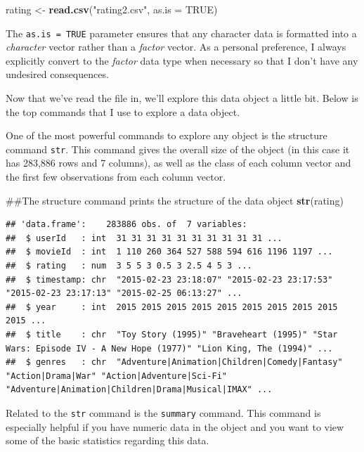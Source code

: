 \documentclass[]{book}
\newenvironment{Shaded}{\begin{snugshade}}{\end{snugshade}}
\newcommand{\KeywordTok}[1]{\textcolor[rgb]{0.13,0.29,0.53}{\textbf{{#1}}}}
\newcommand{\DataTypeTok}[1]{\textcolor[rgb]{0.13,0.29,0.53}{{#1}}}
\newcommand{\StringTok}[1]{\textcolor[rgb]{0.31,0.60,0.02}{{#1}}}
\newcommand{\OtherTok}[1]{\textcolor[rgb]{0.56,0.35,0.01}{{#1}}}
\newcommand{\NormalTok}[1]{{#1}}
\begin{document}
\begin{Shaded}
\begin{Highlighting}[]
\NormalTok{rating <-}\StringTok{ }\KeywordTok{read.csv}\NormalTok{(}\StringTok{"rating2.csv"}\NormalTok{, }\DataTypeTok{as.is =} \OtherTok{TRUE}\NormalTok{)}
\end{Highlighting}
\end{Shaded}

The \texttt{as.is\ =\ TRUE} parameter ensures that any character data is
formatted into a \emph{character} vector rather than a \emph{factor}
vector. As a personal preference, I always explicitly convert to the
\emph{factor} data type when necessary so that I don't have any
undesired consequences.

Now that we've read the file in, we'll explore this data object a little
bit. Below is the top commands that I use to explore a data object.

One of the most powerful commands to explore any object is the structure
command \texttt{str}. This command gives the overall size of the object
(in this case it has 283,886 rows and 7 columns), as well as the class
of each column vector and the first few observations from each column
vector.

\begin{Shaded}
\begin{Highlighting}[]
\NormalTok{##The structure command prints the structure of the data object}
\KeywordTok{str}\NormalTok{(rating)}
\end{Highlighting}
\end{Shaded}

\begin{verbatim}
## 'data.frame':    283886 obs. of  7 variables:
##  $ userId   : int  31 31 31 31 31 31 31 31 31 31 ...
##  $ movieId  : int  1 110 260 364 527 588 594 616 1196 1197 ...
##  $ rating   : num  3 5 5 3 0.5 3 2.5 4 5 3 ...
##  $ timestamp: chr  "2015-02-23 23:18:07" "2015-02-23 23:17:53" "2015-02-23 23:17:13" "2015-02-25 06:13:27" ...
##  $ year     : int  2015 2015 2015 2015 2015 2015 2015 2015 2015 2015 ...
##  $ title    : chr  "Toy Story (1995)" "Braveheart (1995)" "Star Wars: Episode IV - A New Hope (1977)" "Lion King, The (1994)" ...
##  $ genres   : chr  "Adventure|Animation|Children|Comedy|Fantasy" "Action|Drama|War" "Action|Adventure|Sci-Fi" "Adventure|Animation|Children|Drama|Musical|IMAX" ...
\end{verbatim}

Related to the \texttt{str} command is the \texttt{summary} command.
This command is especially helpful if you have numeric data in the
object and you want to view some of the basic statistics regarding this
data.
\end{document}
